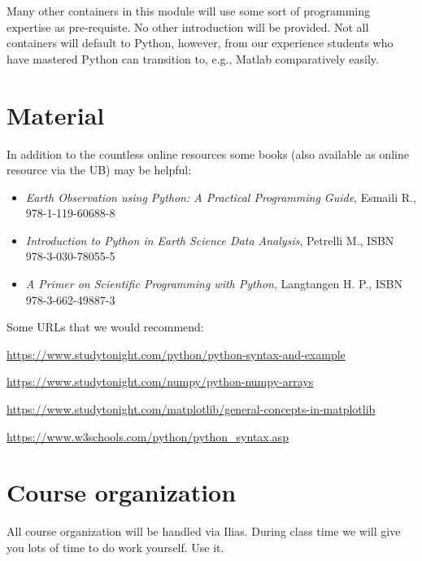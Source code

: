 \documentclass[letterpaper]{inzane_syllabus} %
\begin{document}
Many other containers in this module will use some sort of programming expertise as pre-requiste. No other introduction will be provided. Not all containers will default to Python, however, from our experience students who have mastered Python can transition to, e.g., Matlab comparatively easily.

\section{Material}

In addition to the countless online resources some books (also available as online resource via the UB) may be helpful:
\begin{itemize}
\item \textit{Earth Observation using Python: A Practical Programming Guide}, Esmaili R., 978-1-119-60688-8 
\item \textit{Introduction to Python in Earth Science Data Analysis}, Petrelli M., ISBN 978-3-030-78055-5 
\item \textit{A Primer on Scientific Programming with Python}, Langtangen H. P., ISBN 978-3-662-49887-3
\end{itemize}
Some URLs that we would recommend:

\url{https://www.studytonight.com/python/python-syntax-and-example}

\url{https://www.studytonight.com/numpy/python-numpy-arrays}

\url{https://www.studytonight.com/matplotlib/general-concepts-in-matplotlib}

\url{https://www.w3schools.com/python/python_syntax.asp}

\section{Course organization}

All course organization will be handled via Ilias. During class time we will give you lots of time to do work yourself. Use it.  



\end{document}
